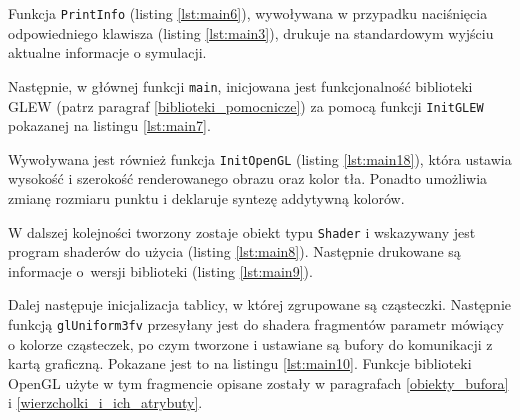 \documentclass[12pt, twoside, openany]{report}
\begin{document}






Funkcja \texttt{PrintInfo} (listing \ref{lst:main6}), wywoływana w przypadku naciśnięcia odpowiedniego klawisza (listing \ref{lst:main3}), drukuje na standardowym wyjściu aktualne informacje o symulacji.



Następnie, w głównej funkcji \texttt{main}, inicjowana jest funkcjonalność biblioteki GLEW (patrz paragraf \ref{biblioteki_pomocnicze}) za pomocą funkcji \texttt{InitGLEW} pokazanej na listingu \ref{lst:main7}.



Wywoływana jest również funkcja \texttt{InitOpenGL} (listing \ref{lst:main18}), która ustawia wysokość i szerokość renderowanego obrazu oraz kolor tła. Ponadto umożliwia zmianę rozmiaru punktu i deklaruje syntezę addytywną kolorów.



W dalszej kolejności tworzony zostaje obiekt typu \texttt{Shader} i wskazywany jest program shaderów do użycia (listing \ref{lst:main8}). Następnie drukowane są informacje o~wersji biblioteki (listing \ref{lst:main9}).





Dalej następuje inicjalizacja tablicy, w której zgrupowane są cząsteczki. Następnie funkcją \texttt{glUniform3fv} przesyłany jest do shadera fragmentów parametr mówiący o kolorze cząsteczek, po czym tworzone i ustawiane są bufory do komunikacji z kartą graficzną. Pokazane jest to na listingu \ref{lst:main10}. Funkcje biblioteki OpenGL użyte w tym fragmencie opisane zostały w paragrafach \ref{obiekty_bufora} i \ref{wierzcholki_i_ich_atrybuty}.
\end{document}
